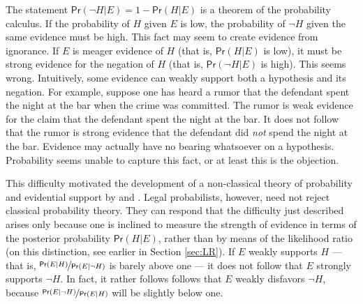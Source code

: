 \documentclass{article}
\newcommand{\pr}{\mathsf{Pr}}
\begin{document}
The statement $\pr(\neg H\vert E) = 1-\pr(H\vert E)$ is a theorem of the probability calculus. If the probability of $H$ given $E$ is low, the probability of $\neg H$ given the same evidence must be high. 
This fact may seem to create evidence from ignorance. If $E$ is meager evidence of $H$ (that is, $\pr(H \vert E)$ is low), it must be strong evidence for the negation of $H$ (that is, $\pr(\neg H \vert E)$ is high). This seems wrong. Intuitively, some evidence can weakly support both a hypothesis and its negation.  For example, suppose one has heard a rumor that the defendant spent the night at the bar when the crime was committed. The rumor is weak evidence for the claim that the defendant spent the night at the bar. It does not follow that the rumor is strong evidence that the defendant did \textit{not} spend the night at the bar. Evidence may actually have no bearing whatsoever on a hypothesis. Probability seems unable to capture this fact, or at least this is the objection.  

This difficulty motivated the development of a non-classical theory of probability and evidential support by \citet{dempster1968Generalization} and \citet{shafer1976mathematical}.
Legal probabilists, however, need not reject classical probability theory. They can respond that the difficulty just described arises only 
because one is inclined to measure  the strength of evidence in terms of the posterior probability $\pr(H \vert E)$,  rather than by means of   the likelihood ratio (on this distinction, see earlier in Section \ref{sec:LR}).
If $E$ weakly supports $H$ --- that is, $\nicefrac{\pr(E \vert H)}{\pr(E \vert \neg H)}$ is barely above one --- it does not follow that $E$ strongly supports $\neg H$. In fact, it rather follows follows that $E$ weakly disfavors $\neg H$, because $\nicefrac{\pr(E \vert \neg H)}{\pr(E \vert H)}$ will be slightly below one. 
\end{document}

